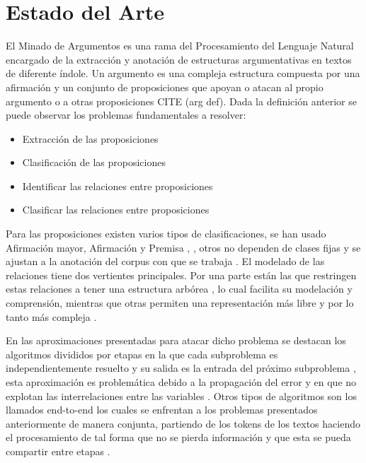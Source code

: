 \chapter{Estado del Arte}\label{chapter:state-of-the-art}

El Minado de Argumentos es una rama del Procesamiento del Lenguaje Natural encargado 
de la extracción y anotación de estructuras argumentativas en textos de diferente índole.
Un argumento es una compleja estructura compuesta por una afirmación y un conjunto de proposiciones
que apoyan o atacan al propio argumento o a otras proposiciones CITE (arg def). Dada la definición
anterior se puede observar los problemas fundamentales a resolver:

\begin{itemize}
    \item Extracción de las proposiciones
    \item Clasificación de las proposiciones
    \item Identificar las relaciones entre proposiciones
    \item Clasificar las relaciones entre proposiciones
\end{itemize}

Para las proposiciones existen varios tipos de clasificaciones, se han usado Afirmación mayor, Afirmación y 
Premisa \cite{eger2017neural}, \cite{stab2017parsing}, otros no dependen de clases fijas y se ajustan 
a la anotación del corpus con que se trabaja \cite{galassi2018argumentative}. El modelado de las relaciones
tiene dos vertientes principales. Por una parte están las que restringen estas relaciones a tener una
estructura arbórea \cite{eger2017neural} \cite{stab2017parsing}, lo cual facilita su modelación y 
comprensión, mientras que otras permiten una representación más libre y por lo tanto más compleja 
\cite{galassi2018argumentative} \cite{niculae2017argument}.

En las aproximaciones presentadas para atacar dicho problema se destacan los algoritmos divididos
por etapas en la que cada subproblema es independientemente resuelto y su salida es la entrada del
próximo subproblema \cite{stab2017parsing} \cite{goudas2015argument}, esta aproximación es problemática debido a la propagación del error y en que no 
explotan las interrelaciones entre las variables \cite{eger2017neural}. Otros tipos de algoritmos son
los llamados end-to-end los cuales se enfrentan a los problemas presentados anteriormente de manera
conjunta, partiendo de los tokens de los textos haciendo el procesamiento de tal forma que no se pierda
información y que esta se pueda compartir entre etapas \cite{eger2017neural}.

